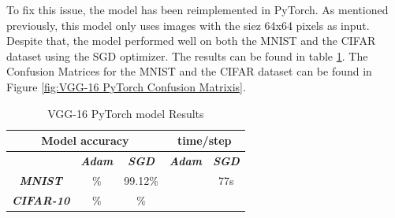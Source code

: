 \documentclass[conference]{IEEEtran}
\begin{document}
To fix this issue, the model has been reimplemented in PyTorch. As mentioned previously, this model only uses images with the siez 64x64 pixels as input.
Despite that, the model performed well on both the MNIST and the CIFAR dataset using the SGD optimizer. The results can be found in table \ref{tab: VGG-16 PyTorch model accuracy}.
The Confusion Matrices for the MNIST and the CIFAR dataset can be found in Figure \ref{fig:VGG-16 PyTorch Confusion Matrixis}.


\begin{table}[!htbp]
    \caption{VGG-16 PyTorch model Results}
    \begin{center}
    \begin{tabular}{|c|c|c|c|c|}
    \cline{1-5} 
    \multicolumn{3}{|c|}{\textbf{Model accuracy}} & \multicolumn{2}{|c|}{\textbf{time/step}} \\
    \hline 
    \textit{} & \textbf{\textit{Adam}} & \textbf{\textit{SGD}} & \textbf{\textit{Adam}} & \textbf{\textit{SGD}} \\
    \hline
    \textbf{\textit{MNIST}} & \% & 99.12\% &  & 77s  \\
    \hline
    \textbf{\textit{CIFAR-10}} & \% & \% &  &  \\
    \cline{1-5} 
    \end{tabular}
    \label{tab: VGG-16 PyTorch model accuracy}
    \end{center}
\end{table}
\end{document}
